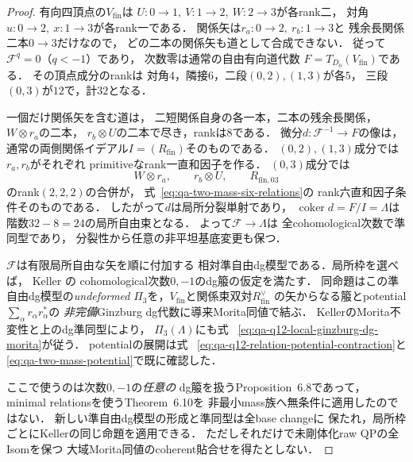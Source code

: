 \begin{proof}
有向四頂点の$V_{\mathrm{fin}}$は
$U:0\to1,\ V:1\to2,\ W:2\to3$が各rank二，
対角$u:0\to2,\ x:1\to3$が各rank一である．
関係矢は$r_a:0\to2,\ r_b:1\to3$と
残余長関係二本$0\to3$だけなので，
どの二本の関係矢も道として合成できない．
従って$\mathscr F^{q}=0$（$q<-1$）であり，
次数零は通常の自由有向道代数
$F=T_{D_0}(V_{\mathrm{fin}})$である．
その頂点成分のrankは
対角$4$，隣接$6$，二段$(0,2),(1,3)$が各$5$，
三段$(0,3)$が$12$で，計$32$となる．

一個だけ関係矢を含む道は，
二短関係自身の各一本，二本の残余長関係，
$W\otimes r_a$の二本，
$r_b\otimes U$の二本で尽き，rankは$8$である．
微分$d:\mathscr F^{-1}\to F$の像は，
通常の両側関係イデアル$I=(R_{\mathrm{fin}})$そのものである．
$(0,2),(1,3)$成分では$r_a,r_b$がそれぞれ
primitiveなrank一直和因子を作る．
$(0,3)$成分では
\[
 W\otimes r_a,\qquad r_b\otimes U,\qquad
 R_{{\mathrm{fin}},03}
\]
のrank$(2,2,2)$の合併が，
式~\eqref{eq:qa-two-mass-six-relations}の
rank六直和因子条件そのものである．
したがって$d$は局所分裂単射であり，
$\operatorname{coker}d=F/I=\Lambda$は
階数$32-8=24$の局所自由束となる．
よって$\mathscr F\to\Lambda$は
全cohomological次数で準同型であり，
分裂性から任意の非平坦基底変更も保つ．

$\mathscr F$は有限局所自由な矢を順に付加する
相対準自由dg模型である．局所枠を選べば，
Keller \cite[Proposition~6.8]{KellerDeformedCY2011}の
cohomological次数$0,-1$のdg箙の仮定を満たす．
同命題はこの準自由dg模型の\emph{undeformed}
$\Pi_3$を，$V_{\mathrm{fin}}$と関係束双対$R_{\mathrm{fin}}^\vee$
の矢からなる箙とpotential
$\sum_\alpha r_\alpha r_\alpha^*$の
\emph{非完備}Ginzburg dg代数に導来Morita同値で結ぶ．
KellerのMorita不変性と上のdg準同型により，
$\Pi_3(\Lambda)$にも式~
\eqref{eq:qa-q12-local-ginzburg-dg-morita}が従う．
potentialの展開は式~
\eqref{eq:qa-q12-relation-potential-contraction}と
\eqref{eq:qa-two-mass-potential}で既に確認した．

ここで使うのは次数$0,-1$の\emph{任意の}
dg箙を扱うProposition~6.8であって，
minimal relationsを使うTheorem~6.10を
非最小mass族へ無条件に適用したのではない．
新しい準自由dg模型の形成と準同型は全base changeに
保たれ，局所枠ごとにKellerの同じ命題を適用できる．
ただしそれだけで未剛体化raw QPの全Isomを保つ
大域Morita同値のcoherent貼合せを得たとしない．
\end{proof}


